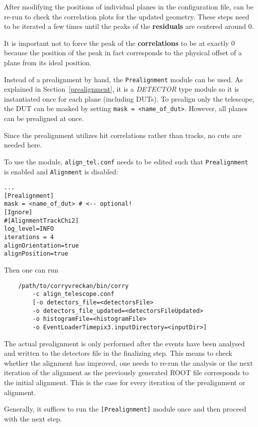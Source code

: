 After modifying the positions of individual planes in the configuration file, \corry can be re-run to check the correlation plots for the updated geometry.
These steps need to be iterated a few times until the peaks of the \textbf{residuals} are centered around 0.
 
It is important not to force the peak of the \textbf{correlations} to be at exactly 0 because the position of the peak in fact corresponds to the physical offset of a plane from its ideal position. 

Instead of a prealignment by hand, the \texttt{Prealignment} module can be used.
As explained in Section~\ref{prealignment}, it is a \textit{DETECTOR} type module so it is instantiated once for each plane (including DUTs).
To prealign only the telescope, the DUT can be masked by setting \texttt{mask = <name\_of\_dut>}.
However, all planes can be prealigned at once.

Since the prealignment utilizes hit correlations rather than tracks, no cuts are needed here.

To use the module, \texttt{align\_tel.conf} needs to be edited such that \texttt{Prealignment} is enabled and \texttt{Alignment} is disabled:
\begin{verbatim}
...
[Prealignment]
mask = <name_of_dut> # <-- optional!
[Ignore]
#[AlignmentTrackChi2]
log_level=INFO
iterations = 4
alignOrientation=true
alignPosition=true
\end{verbatim}

Then one can run
\begin{verbatim}
    /path/to/corryvreckan/bin/corry 
        -c align_telescope.conf
    	[-o detectors_file=<detectorsFile> 
    	-o detectors_file_updated=<detectorsFileUpdated> 
    	-o histogramFile=<histogramFile> 
    	-o EventLoaderTimepix3.inputDirectory=<inputDir>]
\end{verbatim}

The actual prealignment is only performed after the events have been analysed and written to the detectors file in the finalizing step. 
This means to check whether the alignment has improved, one needs to re-run the analysis or the next iteration of the alignment as the previously generated ROOT file corresponds to the initial alignment.
This is the case for every iteration of the prealignment or alignment.

Generally, it suffices to run the \texttt{[Prealignment]} module once and then proceed with the next step.

